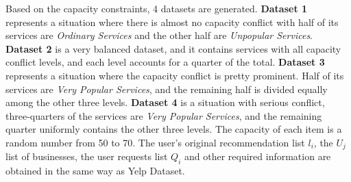 Based on the capacity constraints, 4 datasets are generated. \textbf{Dataset 1} represents a situation where there is almost no capacity conflict with half of its services are \emph{Ordinary Services} and the other half are \emph{Unpopular Services}. \textbf{Dataset 2} is a very balanced dataset, and it contains services with all capacity conflict levels, and each level accounts for a quarter of the total. \textbf{Dataset 3} represents a situation where the capacity conflict is pretty prominent. Half of its services are \emph{Very Popular Services}, and the remaining half is divided equally among the other three levels. \textbf{Dataset 4} is a situation with serious conflict, three-quarters of the services are \emph{Very Popular Services}, and the remaining quarter uniformly contains the other three levels. The capacity of each item is a random number from 50 to 70. The user’s original recommendation list $l_i$, the $U_j$ list of businesses, the user requests list $Q_i$ and other required information are obtained in the same way as Yelp Dataset.
